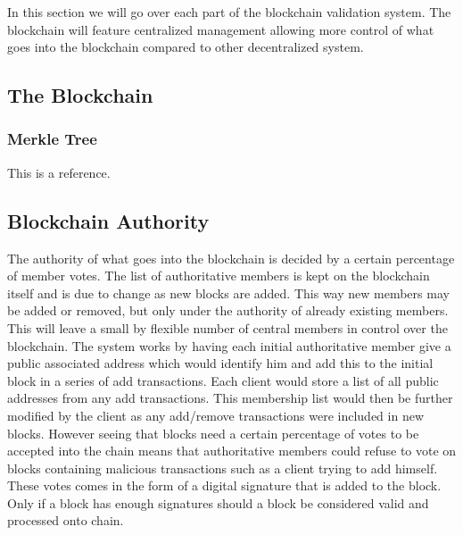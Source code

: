 \documentclass[11pt]{article}
\begin{document}
In this section we will go over each part of the blockchain validation system. The blockchain will feature centralized management allowing more control of what goes into the blockchain compared to other decentralized system.

\subsection{The Blockchain}

\subsubsection{Merkle Tree}
This is a reference.

\subsection{Blockchain Authority}

The authority of what goes into the blockchain is decided by a certain percentage of member votes. The list of authoritative members is kept on the blockchain itself and is due to change as new blocks are added. This way new members may be added or removed, but only under the authority of already existing members. This will leave a small by flexible number of central members in control over the blockchain. The system works by having each initial authoritative member give a public associated address which would identify him and add this to the initial block in a series of add transactions. Each client would store a list of all public addresses from any add transactions. This membership list would then be further modified by the client as any add/remove transactions were included in new blocks. However seeing that blocks need a certain percentage of votes to be accepted into the chain means that authoritative members could refuse to vote on blocks containing malicious transactions such as a client trying to add himself. These votes comes in the form of a digital signature that is added to the block. Only if a block has enough signatures should a block be considered valid and processed onto chain. 

\end{document}
